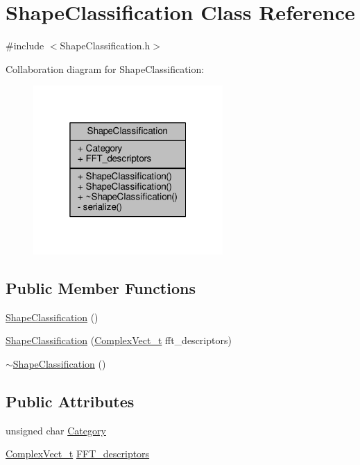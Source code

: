\hypertarget{class_shape_classification}{}\section{Shape\+Classification Class Reference}
\label{class_shape_classification}


{\ttfamily \#include $<$Shape\+Classification.\+h$>$}



Collaboration diagram for Shape\+Classification\+:\nopagebreak
\begin{figure}[H]
\begin{center}
\leavevmode
\includegraphics[width=205pt]{class_shape_classification__coll__graph}
\end{center}
\end{figure}
\subsection*{Public Member Functions}
\begin{DoxyCompactItemize}
\item 
\hyperlink{class_shape_classification_a53cff8a411773e7e36c5afabe3ad5ec3}{Shape\+Classification} ()
\item 
\hyperlink{class_shape_classification_ac5a2cb1251c3c13c1f445cdb017f3ced}{Shape\+Classification} (\hyperlink{_soil_math_types_8h_a7567e521c2b2c408dcb62dbff72390f7}{Complex\+Vect\+\_\+t} fft\+\_\+descriptors)
\item 
\hyperlink{class_shape_classification_a9e5cdfa2409f961494ac2e8e444712e6}{$\sim$\+Shape\+Classification} ()
\end{DoxyCompactItemize}
\subsection*{Public Attributes}
\begin{DoxyCompactItemize}
\item 
unsigned char \hyperlink{class_shape_classification_a5b723e358b86496ed6f4b25e2bf7af17}{Category}
\item 
\hyperlink{_soil_math_types_8h_a7567e521c2b2c408dcb62dbff72390f7}{Complex\+Vect\+\_\+t} \hyperlink{class_shape_classification_afecc3c98ca8a930b359ddd936aad21f3}{F\+F\+T\+\_\+descriptors}
\end{DoxyCompactItemize}
